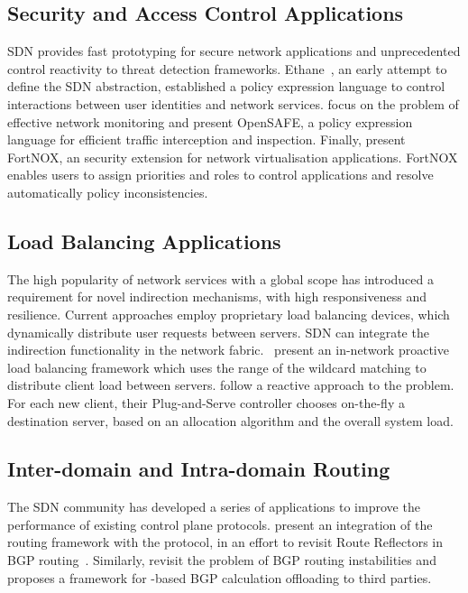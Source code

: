 \subsection{Security and Access Control Applications}

SDN provides fast  prototyping for secure network applications and
unprecedented control reactivity to threat detection frameworks.
Ethane~, an  early attempt to define the SDN
abstraction, established a policy expression language to control interactions
between user identities and network services.   focus on the
problem of effective network monitoring and present OpenSAFE, a policy
expression language for efficient traffic interception and inspection.  Finally,
 present FortNOX, an security extension  for network
virtualisation applications. FortNOX enables users to assign priorities and
roles to control applications and resolve automatically policy inconsistencies. 
 
\subsection{Load Balancing Applications}

The high popularity of network services with a global scope has introduced a
requirement for novel indirection mechanisms, with high responsiveness and
resilience. Current approaches employ proprietary load balancing devices, which
dynamically distribute user requests between servers.  SDN can integrate the
indirection functionality in the network fabric. ~present an
in-network proactive load balancing framework which uses the range of the \of
wildcard matching to distribute client load between servers.
 follow a reactive approach to the problem. For
each new client, their Plug-and-Serve controller chooses on-the-fly a
destination server, based on an allocation algorithm and the overall system
load.

\subsection{Inter-domain and Intra-domain Routing}

The SDN community has developed a series of applications to improve the
performance of existing control plane protocols.   present
an integration of the 
 routing framework with the \of protocol, in an effort to
revisit Route Reflectors in BGP routing~. Similarly,
 revisit the problem of BGP routing instabilities and
proposes a framework for \of-based BGP calculation offloading to third parties.

